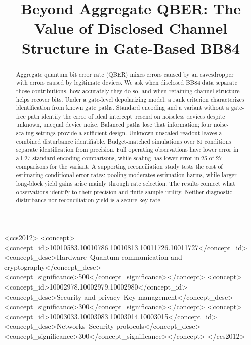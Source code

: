 \documentclass[manuscript,screen,review,anonymous]{acmart}
\begin{document}
\title[Disclosed Channel Structure in BB84]{Beyond Aggregate QBER: The Value of Disclosed Channel Structure in Gate-Based BB84}

\begin{abstract}
Aggregate quantum bit error rate (QBER) mixes errors caused by an eavesdropper
with errors caused by legitimate devices. We ask when disclosed BB84 data
separate those contributions, how accurately they do so, and when retaining
channel structure helps recover bits. Under a gate-level depolarizing model,
a rank criterion characterizes identification from known gate paths.
Standard encoding and a variant without a gate-free path identify the
error of ideal intercept--resend on noiseless devices despite unknown, unequal device
noise. Balanced paths lose that information; four noise-scaling settings
provide a sufficient design. Unknown unscaled readout leaves a combined
disturbance identifiable. Budget-matched simulations over 81 conditions
separate identification from precision. Full operating observations have
lower error in all 27 standard-encoding comparisons, while scaling has
lower error in 25 of 27 comparisons for the variant. A supporting
reconciliation study tests the cost of estimating conditional error rates:
pooling moderates estimation harms, while larger long-block yield gains
arise mainly through rate selection. The results connect what observations
identify to their precision and finite-sample utility. Neither diagnostic
disturbance nor reconciliation yield is a secure-key rate.
\end{abstract}

\begin{CCSXML}
<ccs2012>
 <concept><concept_id>10010583.10010786.10010813.10011726.10011727</concept_id><concept_desc>Hardware~Quantum communication and cryptography</concept_desc><concept_significance>500</concept_significance></concept>
 <concept><concept_id>10002978.10002979.10002980</concept_id><concept_desc>Security and privacy~Key management</concept_desc><concept_significance>300</concept_significance></concept>
 <concept><concept_id>10003033.10003083.10003014.10003015</concept_id><concept_desc>Networks~Security protocols</concept_desc><concept_significance>300</concept_significance></concept>
</ccs2012>
\end{CCSXML}
\end{document}
